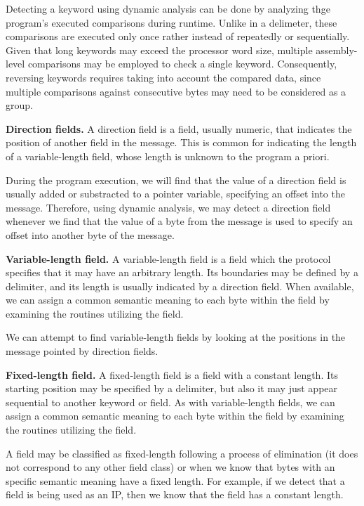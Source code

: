 \documentclass[conference]{IEEEtran}
\begin{document}
Detecting a keyword using dynamic analysis can be done by analyzing thge
program's executed comparisons during runtime. Unlike in a delimeter, these
comparisons are executed only once rather instead of repeatedly or
sequentially. Given that long keywords may exceed the processor word size,
multiple assembly-level comparisons may be employed to check a single keyword.
Consequently, reversing keywords requires taking into account the compared
data, since multiple comparisons against consecutive bytes may need to be
considered as a group.

\textbf{Direction fields.} A direction field is a field, usually numeric, that indicates the
position of another field in the message. This is common for indicating the length of a variable-length
field, whose length is unknown to the program a priori.

During the program execution, we will find that the value of a direction field
is usually added or substracted to a pointer variable, specifying an offset
into the message. Therefore, using dynamic analysis, we may detect a direction
field whenever we find that the value of a byte from the message is used to
specify an offset into another byte of the message.

\textbf{Variable-length field.} A variable-length field is a field which the protocol specifies
that it may have an arbitrary length. Its boundaries may be defined by a delimiter, and its length
is usually indicated by a direction field.
When available, we can assign a common semantic meaning to each byte within the field by
examining the routines utilizing the field.

We can attempt to find variable-length fields by looking at the positions in
the message pointed by direction fields.

\textbf{Fixed-length field.} A fixed-length field is a field with a constant length. Its starting
position may be specified by a delimiter, but also it may just appear sequential to another keyword
or field.
As with variable-length fields, we can assign a common semantic meaning to each byte within the field by
examining the routines utilizing the field.

A field may be classified as fixed-length following a process of elimination
(it does not correspond to any other field class) or when we know that bytes
with an specific semantic meaning have a fixed length. For example, if we
detect that a field is being used as an IP, then we know that the field has a
constant length.
\end{document}
